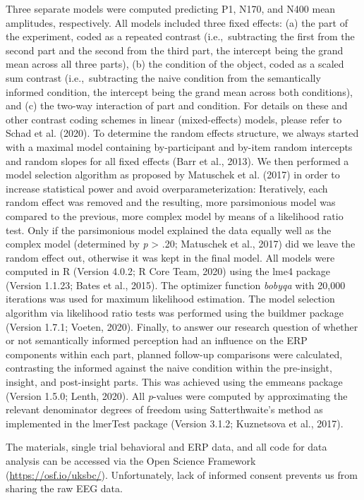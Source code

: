 \documentclass[
  english,
  doc,12pt,twoside,floatsintext]{apa7}
\begin{document}
Three separate models were computed predicting P1, N170, and N400 mean amplitudes, respectively. All models included three fixed effects: (a) the part of the experiment, coded as a repeated contrast (i.e.,~subtracting the first from the second part and the second from the third part, the intercept being the grand mean across all three parts), (b) the condition of the object, coded as a scaled sum contrast (i.e.,~subtracting the naive condition from the semantically informed condition, the intercept being the grand mean across both conditions), and (c) the two-way interaction of part and condition. For details on these and other contrast coding schemes in linear (mixed-effects) models, please refer to Schad et al. (2020). To determine the random effects structure, we always started with a maximal model containing by-participant and by-item random intercepts and random slopes for all fixed effects (Barr et al., 2013). We then performed a model selection algorithm as proposed by Matuschek et al. (2017) in order to increase statistical power and avoid overparameterization: Iteratively, each random effect was removed and the resulting, more parsimonious model was compared to the previous, more complex model by means of a likelihood ratio test. Only if the parsimonious model explained the data equally well as the complex model (determined by \emph{p} \textgreater{} .20; Matuschek et al., 2017) did we leave the random effect out, otherwise it was kept in the final model. All models were computed in R (Version 4.0.2; R Core Team, 2020) using the lme4 package (Version 1.1.23; Bates et al., 2015). The optimizer function \emph{bobyqa} with 20,000 iterations was used for maximum likelihood estimation. The model selection algorithm via likelihood ratio tests was performed using the buildmer package (Version 1.7.1; Voeten, 2020). Finally, to answer our research question of whether or not semantically informed perception had an influence on the ERP components within each part, planned follow-up comparisons were calculated, contrasting the informed against the naive condition within the pre-insight, insight, and post-insight parts. This was achieved using the emmeans package (Version 1.5.0; Lenth, 2020). All \emph{p}-values were computed by approximating the relevant denominator degrees of freedom using Satterthwaite's method as implemented in the lmerTest package (Version 3.1.2; Kuznetsova et al., 2017).

The materials, single trial behavioral and ERP data, and all code for data analysis can be accessed via the Open Science Framework (\url{https://osf.io/uksbc/}). Unfortunately, lack of informed consent prevents us from sharing the raw EEG data.
\end{document}
